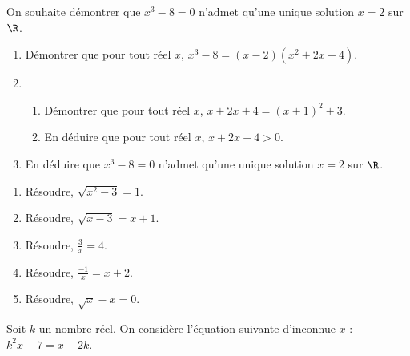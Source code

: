 \documentclass[10pt]{article}
\begin{document}
On souhaite démontrer que $x^3-8=0$ n'admet qu'une unique solution $x=2$ sur $\R$.

\begin{enumerate}
\item Démontrer que pour tout réel $x$, $x^3-8=(x-2)(x^2+2x+4)$.
\item
\begin{enumerate}
\item Démontrer que pour tout réel $x$, $x+2x+4=(x+1)^2+3$.
\item En déduire que pour tout réel $x$, $x+2x+4>0$.
\end{enumerate}
\item En déduire que $x^3-8=0$ n'admet qu'une unique solution $x=2$ sur $\R$. 
\end{enumerate}




\begin{enumerate}
\item Résoudre, $\sqrt{x^2-3}=1$.
\item Résoudre, $\sqrt{x-3}=x+1$. 
\item Résoudre, $\frac{3}{x}=4$. 
\item Résoudre, $\frac{-1}{x}=x+2$. 
\item Résoudre, $\sqrt{x}-x=0$. 
\end{enumerate}





Soit $k$ un nombre réel. On considère l'équation suivante d'inconnue $x$ : $k^2x+7=x-2k$.
\end{document}
